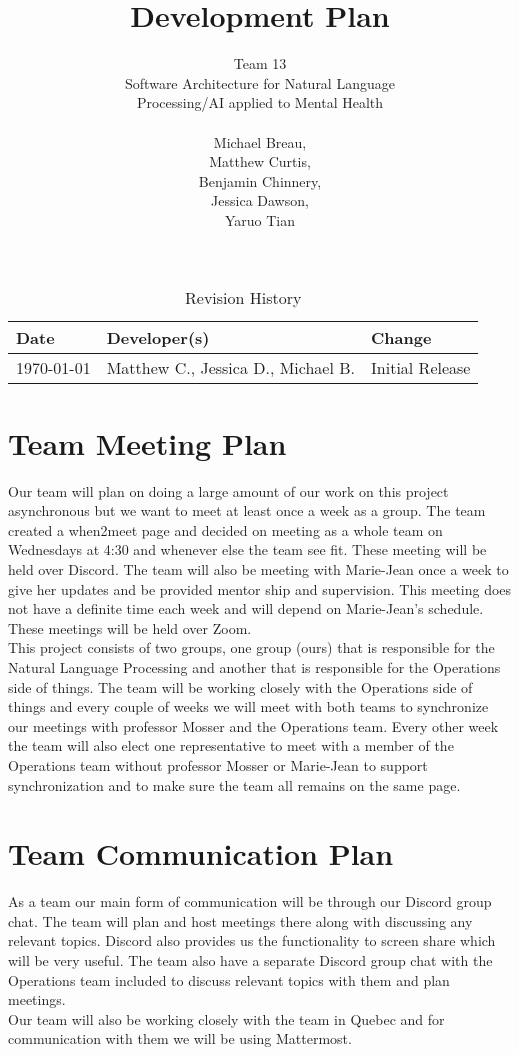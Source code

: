 \documentclass{article}
\title{Development Plan}
\author{Team 13 \\Software Architecture for Natural Language
\\ Processing/AI applied to Mental Health \\
\\Michael Breau, \\Matthew Curtis, \\Benjamin Chinnery, \\Jessica Dawson, \\Yaruo Tian}
\date{}
\begin{document}
\maketitle

\begin{table}[hp]
  \caption{Revision History} \label{TblRevisionHistory}
  \begin{tabularx}{\textwidth}{llX}
  \toprule
  \textbf{Date} & \textbf{Developer(s)} & \textbf{Change}\\
  \midrule
  \today &  Matthew C., Jessica D., Michael B. & Initial Release\\
  \bottomrule
  \end{tabularx}
  \end{table}

\section{Team Meeting Plan}

Our team will plan on doing a large amount of our work on this project asynchronous but we want to meet at least once a week as a group. The team created a when2meet page and decided on meeting as a whole team on Wednesdays at 4:30 and whenever else the team see fit. These meeting will be held over Discord. The team will also be meeting with Marie-Jean once a week to give her updates and be provided mentor ship and supervision. This meeting does not have a definite time each week and will depend on Marie-Jean's schedule. These meetings will be held over Zoom.\\

This project consists of two groups, one group (ours) that is responsible for the Natural Language Processing and another that is responsible for the Operations side of things. The team will be working closely with the Operations side of things and every couple of weeks we will meet with both teams to synchronize our meetings with professor Mosser and the Operations team. Every other week the team will also elect one representative to meet with a member of the Operations team without professor Mosser or Marie-Jean to support synchronization and to make sure the team all remains on the same page.
\section{Team Communication Plan}

As a team our main form of communication will be through our Discord group chat. The team will plan and host meetings there along with discussing any relevant topics. Discord also provides us the functionality to screen share which will be very useful. The team also have a separate Discord group chat with the Operations team included to discuss relevant topics with them and plan meetings.\\
Our team will also be working closely with the team in Quebec and for communication with them we will be using Mattermost.
\end{document}
